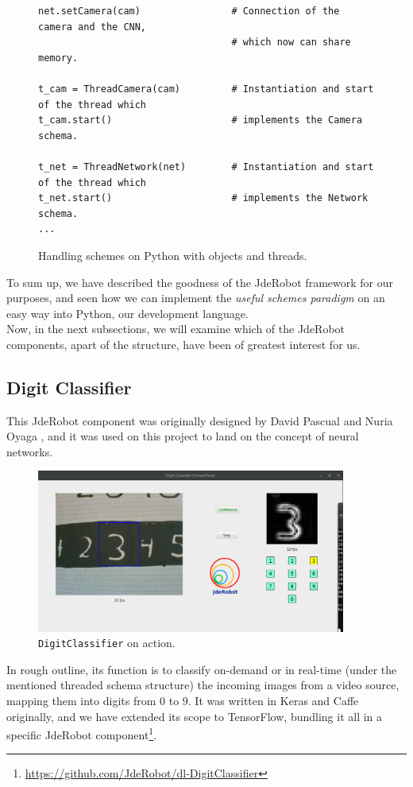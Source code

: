 \begin{itemize}
\begin{figure}[h]
\begin{lstlisting}
net.setCamera(cam)                # Connection of the camera and the CNN,
                                  # which now can share memory.

t_cam = ThreadCamera(cam)         # Instantiation and start of the thread which
t_cam.start()                     # implements the Camera schema.

t_net = ThreadNetwork(net)        # Instantiation and start of the thread which
t_net.start()                     # implements the Network schema.
...
			\end{lstlisting}
			\caption{Handling schemes on Python with objects and threads.}
			\label{fig:3_schemes_python}
		\end{figure}
	\end{itemize}
	
	\vspace{0.4in}
	
	To sum up, we have described the goodness of the JdeRobot framework for our purposes, and seen how we can implement the \textit{useful schemes paradigm} on an easy way into Python, our development language.\\
	
	Now, in the next subsections, we will examine which of the JdeRobot components, apart of the structure, have been of greatest interest for us.
	
	\subsection{Digit Classifier}
	\label{sec:3_digitclassifier_jderobot}
		This JdeRobot component was originally designed by David Pascual \cite{dpascualhe} and Nuria Oyaga \cite{noyaga}, and it was used on this project to land on the concept of neural networks.\\
		\begin{figure}[h]
			\centering
			\includegraphics[width=4in]{images/digitclassifier}
			\caption{\texttt{DigitClassifier} on action.}
			\label{fig:3_digitclassifier}
		\end{figure}
		In rough outline, its function is to classify on-demand or in real-time (under the mentioned threaded schema structure) the incoming images from a video source, mapping them into digits from $0$ to $9$. It was written in Keras and Caffe originally, and we have extended its scope to TensorFlow, bundling it all in a specific JdeRobot component\footnote{\url{https://github.com/JdeRobot/dl-DigitClassifier}}.\\
		

